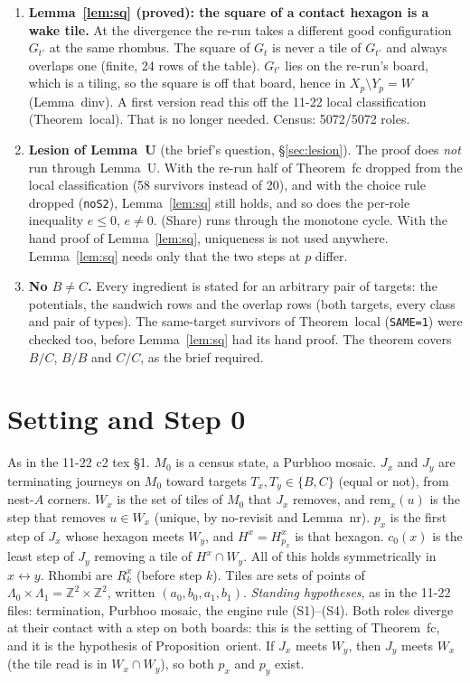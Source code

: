 \documentclass[11pt]{article}
\theoremstyle{definition}\newtheorem{definition}[theorem]{Definition}\newtheorem{remark}[theorem]{Remark}
\newcommand{\Z}{\mathbb Z}
\begin{document}
\begin{enumerate}
whose equality case forces a class-0 b-step at a class-1 rhombus. Corollary~\ref{cor:share}: (Share) and $c_0(x)=p_y$, $c_0(y)=p_x$.
\item \textbf{Lemma~\ref{lem:sq} (proved): the square of a contact hexagon is a wake tile.} At the divergence the re-run takes a different good configuration $G_{t'}$ at the same rhombus. The square of $G_t$ is never a tile of $G_{t'}$ and always overlaps one (finite, 24 rows of the table). $G_{t'}$ lies on the re-run's board, which is a tiling, so the square is off that board, hence in $X_p\setminus Y_p=W$ (Lemma~dinv). A first version read this off the 11-22 local classification (Theorem~local). That is no longer needed. Census: 5072/5072 roles.
\item \textbf{Lesion of Lemma~U} (the brief's question, \S\ref{sec:lesion}). The proof does \emph{not} run through Lemma~U. With the re-run half of Theorem~fc dropped from the local classification (58 survivors instead of 20), and with the choice rule dropped (\texttt{noS2}), Lemma~\ref{lem:sq} still holds, and so does the per-role inequality $e\le0$, $e\ne0$. (Share) runs through the monotone cycle. With the hand proof of Lemma~\ref{lem:sq}, uniqueness is not used anywhere. Lemma~\ref{lem:sq} needs only that the two steps at $p$ differ.
\item \textbf{No $B\ne C$.} Every ingredient is stated for an arbitrary pair of targets: the potentials, the sandwich rows and the overlap rows (both targets, every class and pair of types). The same-target survivors of Theorem~local (\texttt{SAME=1}) were checked too, before Lemma~\ref{lem:sq} had its hand proof. The theorem covers $B/C$, $B/B$ and $C/C$, as the brief required.
\end{enumerate}

\section{Setting and Step 0}\label{sec:set}
As in the 11-22 c2 tex \S1. $M_0$ is a census state, a Purbhoo mosaic. $J_x$ and $J_y$ are terminating journeys on $M_0$ toward targets $T_x,T_y\in\{B,C\}$ (equal or not), from nest-$A$ corners. $W_x$ is the set of tiles of $M_0$ that $J_x$ removes, and $\mathrm{rem}_x(u)$ is the step that removes $u\in W_x$ (unique, by no-revisit and Lemma~nr). $p_x$ is the first step of $J_x$ whose hexagon meets $W_y$, and $H^x=H^x_{p_x}$ is that hexagon. $c_0(x)$ is the least step of $J_y$ removing a tile of $H^x\cap W_y$. All of this holds symmetrically in $x\leftrightarrow y$. Rhombi are $R^x_k$ (before step $k$). Tiles are sets of points of $\Lambda_0\times\Lambda_1=\Z^2\times\Z^2$, written $(a_0,b_0,a_1,b_1)$.
\emph{Standing hypotheses}, as in the 11-22 files: termination, Purbhoo mosaic, the engine rule (S1)--(S4). Both roles diverge at their contact with a step on both boards: this is the setting of Theorem~fc, and it is the hypothesis of Proposition~orient. If $J_x$ meets $W_y$, then $J_y$ meets $W_x$ (the tile read is in $W_x\cap W_y$), so both $p_x$ and $p_y$ exist.
\end{document}
